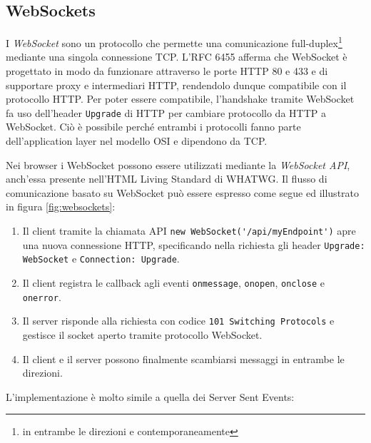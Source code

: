 \documentclass[12pt,a4paper,openright,twoside]{report}
\begin{document}
\subsection{WebSockets}
I \textit{WebSocket} sono un protocollo che permette una comunicazione full-duplex\footnote{in entrambe le direzioni e contemporaneamente} mediante una singola connessione TCP.
L'RFC 6455 afferma che WebSocket è progettato in modo da funzionare attraverso le porte HTTP 80 e 433 e di supportare proxy e intermediari HTTP, rendendolo dunque compatibile con il protocollo HTTP\cite{websockets_rfc}. Per poter essere compatibile, l'handshake tramite WebSocket fa uso dell'header \lstinline{Upgrade} di HTTP per cambiare protocollo da HTTP a WebSocket. Ciò è possibile perché entrambi i protocolli fanno parte dell'application layer nel modello OSI e dipendono da TCP.

\bigskip

Nei browser i WebSocket possono essere utilizzati mediante la \textit{WebSocket API}, anch'essa presente nell'HTML Living Standard di WHATWG.
Il flusso di comunicazione basato su WebSocket può essere espresso come segue\cite{websockets} ed illustrato in figura \ref{fig:websockets}:
\begin{enumerate}
  \item Il client tramite la chiamata API \lstinline{new WebSocket('/api/myEndpoint')} apre una nuova connessione HTTP, specificando nella richiesta gli header \lstinline{Upgrade: WebSocket} e \lstinline{Connection: Upgrade}.
  \item Il client registra le callback agli eventi \lstinline{onmessage}, \lstinline{onopen}, \lstinline{onclose} e \lstinline{onerror}.
  \item Il server risponde alla richiesta con codice \lstinline{101 Switching Protocols} e gestisce il socket aperto tramite protocollo WebSocket.
  \item Il client e il server possono finalmente scambiarsi messaggi in entrambe le direzioni.
\end{enumerate}
L'implementazione è molto simile a quella dei Server Sent Events:

\end{document}

